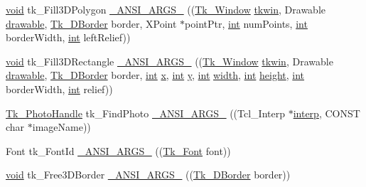 \begin{DoxyCompactItemize}
\item 
\hyperlink{tk_8h_aba408b7cd755a96426e004c015f5de8e}{void} tk\+\_\+\+Fill3\+D\+Polygon \hyperlink{struct_tk_stubs_af9bbe88e8bd143d48c079266618c0ad1}{\+\_\+\+A\+N\+S\+I\+\_\+\+A\+R\+G\+S\+\_\+} ((\hyperlink{tk_8h_ab756137de3ee74edc2501bd0d761e37c}{Tk\+\_\+\+Window} \hyperlink{tk_8h_a35df722e7e1b6efd651683b8be7c1490}{tkwin}, Drawable \hyperlink{tk_8h_aa51f8466cbc86ba8ba27b8e32a0361c7}{drawable}, \hyperlink{tk_8h_a7691523098431859a6f7514f1422e545}{Tk\+\_\+D\+Border} border, X\+Point $\ast$point\+Ptr, \hyperlink{tk_8h_a83f82f76e7fed06f4c49d2db94028a6d}{int} num\+Points, \hyperlink{tk_8h_a83f82f76e7fed06f4c49d2db94028a6d}{int} border\+Width, \hyperlink{tk_8h_a83f82f76e7fed06f4c49d2db94028a6d}{int} left\+Relief))
\item 
\hyperlink{tk_8h_aba408b7cd755a96426e004c015f5de8e}{void} tk\+\_\+\+Fill3\+D\+Rectangle \hyperlink{struct_tk_stubs_a7bc08d94a47778d4df1f2fc628686b9c}{\+\_\+\+A\+N\+S\+I\+\_\+\+A\+R\+G\+S\+\_\+} ((\hyperlink{tk_8h_ab756137de3ee74edc2501bd0d761e37c}{Tk\+\_\+\+Window} \hyperlink{tk_8h_a35df722e7e1b6efd651683b8be7c1490}{tkwin}, Drawable \hyperlink{tk_8h_aa51f8466cbc86ba8ba27b8e32a0361c7}{drawable}, \hyperlink{tk_8h_a7691523098431859a6f7514f1422e545}{Tk\+\_\+D\+Border} border, \hyperlink{tk_8h_a83f82f76e7fed06f4c49d2db94028a6d}{int} \hyperlink{tk_8h_a61ebd54d47cc56787649a3b8f126bda1}{x}, \hyperlink{tk_8h_a83f82f76e7fed06f4c49d2db94028a6d}{int} \hyperlink{tk_8h_a40f4f3601c0eaa8ca46b1a164264696d}{y}, \hyperlink{tk_8h_a83f82f76e7fed06f4c49d2db94028a6d}{int} \hyperlink{tk_8h_a29e50a5401c1396b3a2aa3487f74d468}{width}, \hyperlink{tk_8h_a83f82f76e7fed06f4c49d2db94028a6d}{int} \hyperlink{tk_8h_a67be2f4b9d9c5b3559139bfb072e2e81}{height}, \hyperlink{tk_8h_a83f82f76e7fed06f4c49d2db94028a6d}{int} border\+Width, \hyperlink{tk_8h_a83f82f76e7fed06f4c49d2db94028a6d}{int} relief))
\item 
\hyperlink{tk_8h_a520235ad96306582a0c61a587616c338}{Tk\+\_\+\+Photo\+Handle} tk\+\_\+\+Find\+Photo \hyperlink{struct_tk_stubs_a8df216b71762ab4bc419a31929e3ede6}{\+\_\+\+A\+N\+S\+I\+\_\+\+A\+R\+G\+S\+\_\+} ((Tcl\+\_\+\+Interp $\ast$\hyperlink{tk_8h_a5ab79c0f5849ee8e6a2e955a6c536cc0}{interp}, C\+O\+N\+ST char $\ast$image\+Name))
\item 
Font tk\+\_\+\+Font\+Id \hyperlink{struct_tk_stubs_a04dc9a2846ffa101c82e3e0031abcf4d}{\+\_\+\+A\+N\+S\+I\+\_\+\+A\+R\+G\+S\+\_\+} ((\hyperlink{tk_8h_a9fc14938fbad69507d71d60fe79e26f6}{Tk\+\_\+\+Font} font))
\item 
\hyperlink{tk_8h_aba408b7cd755a96426e004c015f5de8e}{void} tk\+\_\+\+Free3\+D\+Border \hyperlink{struct_tk_stubs_a99ca7c5ac5dafb5a9e8fa5cd0172e857}{\+\_\+\+A\+N\+S\+I\+\_\+\+A\+R\+G\+S\+\_\+} ((\hyperlink{tk_8h_a7691523098431859a6f7514f1422e545}{Tk\+\_\+D\+Border} border))

\end{DoxyCompactItemize}
